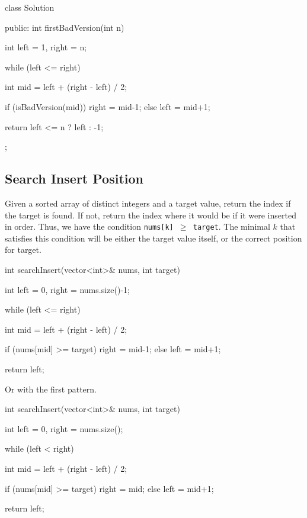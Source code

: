 \documentclass{report}
\begin{document}
   \bigbreak \noindent 
   \begin{cppcode}
       class Solution {
           public:
           int firstBadVersion(int n) {
               int left = 1, right = n;

               while (left <= right) {
                   int mid = left + (right - left) / 2;

                   if (isBadVersion(mid)) {
                       right = mid-1;
                   } else {
                       left = mid+1;
                   }
               }
               return left <= n ? left : -1;
           }
       };
   \end{cppcode}

   \bigbreak \noindent 
   \subsection{Search Insert Position}
   \bigbreak \noindent 
   Given a sorted array of distinct integers and a target value, return the index if the target is found. If not, return the index where it would be if it were inserted in order.
   \bigbreak \noindent 
   Thus, we have the condition \texttt{nums[k] $\geq$ target}. The minimal $k$ that satisfies this condition will be either the target value itself, or the correct position for target.
   \bigbreak \noindent 
   \begin{cppcode}
       int searchInsert(vector<int>& nums, int target) {
           int left = 0, right = nums.size()-1;

           while (left <= right) {
               int mid = left + (right - left) / 2;

               if (nums[mid] >= target) {
                   right = mid-1;
               } else {
                   left = mid+1;
               }
           }
           return left;
       }
   \end{cppcode}
   \bigbreak \noindent 
   Or with the first pattern.
   \bigbreak \noindent 
   \begin{cppcode}
       int searchInsert(vector<int>& nums, int target) {
           int left = 0, right = nums.size();

           while (left < right) {
               int mid = left + (right - left) / 2;

               if (nums[mid] >= target) {
                   right = mid;
               } else {
                   left = mid+1;
               }
           }
           return left;
       }
   \end{cppcode}
\end{document}
